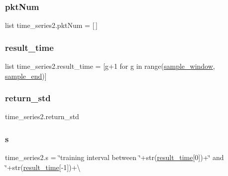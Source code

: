 \mbox{\label{namespacetime__series2_ab18c2a5668ac375ae8024899566ec9cb}} 
\subsubsection{\texorpdfstring{pkt\+Num}{pktNum}}
{\footnotesize\ttfamily list time\+\_\+series2.\+pkt\+Num = \mbox{[}$\,$\mbox{]}}

\mbox{\label{namespacetime__series2_a8bc1ba75be8714303adfe853be1fdfa7}} 
\subsubsection{\texorpdfstring{result\+\_\+time}{result\_time}}
{\footnotesize\ttfamily list time\+\_\+series2.\+result\+\_\+time = \mbox{[}g+1 for g in range(\mbox{\hyperlink{namespacetime__series2_abbcc8a8aa4c18c3850b74368b2728790}{sample\+\_\+window}}, \mbox{\hyperlink{namespacetime__series2_ad170197f80cacfa1a597f0cc81af1ed5}{sample\+\_\+end}})\mbox{]}}

\mbox{\label{namespacetime__series2_a6438463f77ead66c93e77557813fc843}} 
\subsubsection{\texorpdfstring{return\+\_\+std}{return\_std}}
{\footnotesize\ttfamily time\+\_\+series2.\+return\+\_\+std}

\mbox{\label{namespacetime__series2_a1cde44ae6d15f2025f459a56910bb627}} 
\subsubsection{\texorpdfstring{s}{s}}
{\footnotesize\ttfamily time\+\_\+series2.\+s = \char`\"{}training interval between \char`\"{}+str(\mbox{\hyperlink{namespacetime__series2_a8bc1ba75be8714303adfe853be1fdfa7}{result\+\_\+time}}\mbox{[}0\mbox{]})+\char`\"{} and \char`\"{}+str(\mbox{\hyperlink{namespacetime__series2_a8bc1ba75be8714303adfe853be1fdfa7}{result\+\_\+time}}\mbox{[}-\/1\mbox{]})+\textbackslash{}}

